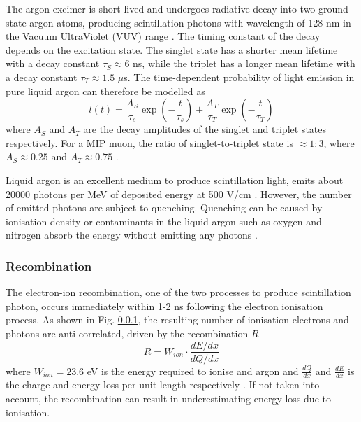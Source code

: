 The argon excimer is short-lived and undergoes radiative decay into two ground-state argon atoms, producing scintillation photons with wavelength of 128 nm in the Vacuum UltraViolet (VUV) range \cite{}.
The timing constant of the decay depends on the excitation state.
The singlet state has a shorter mean lifetime with a decay constant $\tau_{S} \approx 6$ ns, while the triplet has a longer mean lifetime with a decay constant $\tau_{T} \approx 1.5$ $\mu$s.
The time-dependent probability of light emission in pure liquid argon can therefore be modelled as
\begin{equation}
	l(t)=\frac{A_{S}}{\tau_{s}}\exp{\left(-\frac{t}{\tau_{s}}\right)} +\frac{A_{T}}{\tau_{T}}\exp{\left(-\frac{t}{\tau_{T}}\right)}
\end{equation}
where $A_{S}$ and $A_{T}$ are the decay amplitudes of the singlet and triplet states respectively. For a MIP muon, the ratio of singlet-to-triplet state is $\approx 1:3$, where $A_{S} \approx 0.25$ and $A_{T} \approx 0.75$ \cite{}.

Liquid argon is an excellent medium to produce scintillation light, emits about 20000 photons per MeV of deposited energy at 500 V/cm \cite{}.
However, the number of emitted photons are subject to quenching.
Quenching can be caused by ionisation density \cite{} or contaminants in the liquid argon such as oxygen and nitrogen absorb the energy without emitting any photons \cite{}.

\subsubsection{Recombination}


The electron-ion recombination, one of the two processes to produce scintillation photon, occurs immediately within 1-2 ns following the electron ionisation process.
As shown in Fig. \ref{}, the resulting number of ionisation electrons and photons are anti-correlated, driven by the recombination $R$ 
\begin{equation}
	R=W_{ion} \cdot \frac{dE/dx}{dQ/dx}
\end{equation}
where $W_{ion} = 23.6$ eV is the energy required to ionise and argon and $\frac{dQ}{dx}$ and $\frac{dE}{dx}$ is the charge and energy loss per unit length respectively \cite{}. 
If not taken into account, the recombination can result in underestimating energy loss due to ionisation.

